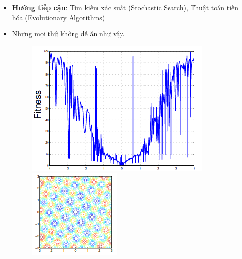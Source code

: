 \documentclass{book}
\begin{document}
\begin{itemize}
\begin{itemize}
        \item \textbf{Hướng tiếp cận}: Tìm kiếm xác suất (Stochastic Search), Thuật toán tiến hóa (Evolutionary Algorithms)
        \item Nhưng mọi thứ không dễ ăn như vậy.
        \begin{figure}[H]
            \centering
            \begin{minipage}[c]{0.3\textwidth}
                \centering
                \includegraphics[width=\textwidth]{images/objective_func_1.png}
            \end{minipage}\hfill
            \begin{minipage}[c]{0.3\textwidth}
                \centering
                \includegraphics[width=\textwidth]{images/objective_func_2.png}

\end{minipage}
\end{figure}
\end{itemize}
\end{itemize}
\end{document}
